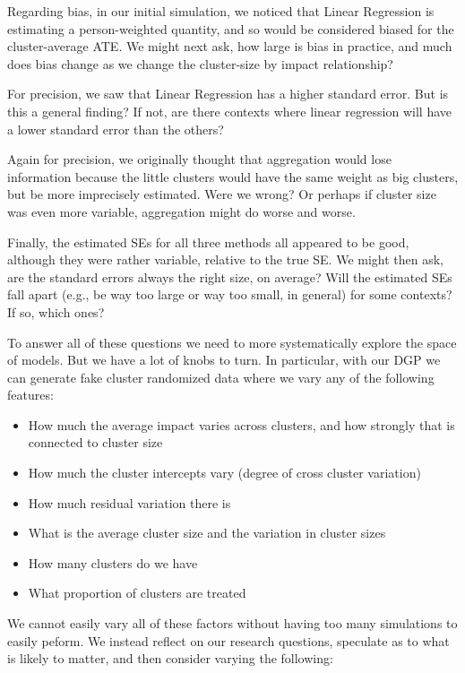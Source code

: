 \documentclass[
]{book}
\providecommand{\tightlist}{%
  \setlength{\itemsep}{0pt}\setlength{\parskip}{0pt}}
\begin{document}
Regarding bias, in our initial simulation, we noticed that Linear Regression is estimating a person-weighted quantity, and so would be considered biased for the cluster-average ATE.
We might next ask, how large is bias in practice, and much does bias change as we change the cluster-size by impact relationship?

For precision, we saw that Linear Regression has a higher standard error.
But is this a general finding? If not, are there contexts where linear regression will have a lower standard error than the others?

Again for precision, we originally thought that aggregation would lose information because the little clusters would have the same weight as big clusters, but be more imprecisely estimated.
Were we wrong? Or perhaps if cluster size was even more variable, aggregation might do worse and worse.

Finally, the estimated SEs for all three methods all appeared to be good, although they were rather variable, relative to the true SE.
We might then ask, are the standard errors always the right size, on average? Will the estimated SEs fall apart (e.g., be way too large or way too small, in general) for some contexts? If so, which ones?

To answer all of these questions we need to more systematically explore the space of models.
But we have a lot of knobs to turn.
In particular, with our DGP we can generate fake cluster randomized data where we vary any of the following features:

\begin{itemize}
\tightlist
\item
  How much the average impact varies across clusters, and how strongly that is connected to cluster size
\item
  How much the cluster intercepts vary (degree of cross cluster variation)
\item
  How much residual variation there is
\item
  What is the average cluster size and the variation in cluster sizes
\item
  How many clusters do we have
\item
  What proportion of clusters are treated
\end{itemize}

We cannot easily vary all of these factors without having too many simulations to easily peform.
We instead reflect on our research questions, speculate as to what is likely to matter, and then consider varying the following:
\end{document}
